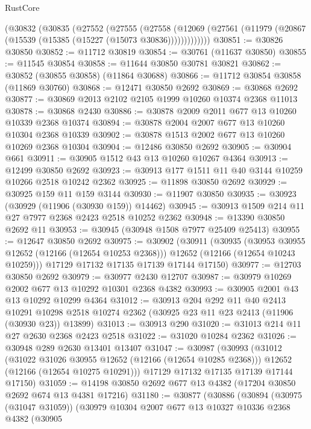 \begin{lexlean}{RustCore}
\begin{coremodule}
    (@30832
      (@30835
        (@27552
          (@27555
            (@27558
              (@12069 (@27561 (@11979 (@20867 (@15539 (@15385 (@15227 (@15073 @30836)))))))))))))
@30851 := @30826 @30850
@30852 := @11712 @30819
@30854 := @30761 (@11637 @30850)
@30855 := @11545 @30854
@30858 := @11644 @30850 @30781 @30821
@30862 := @30852 (@30855 @30858) (@11864 @30688)
@30866 := @11712 @30854 @30858 (@11869 @30760)
@30868 := @12471 @30850 @2692
@30869 := @30868 @2692
@30877 := @30869 @2013 @2102 @2105 @1999 @10260 @10374 @2368 @11013
@30878 := @30868 @2430
@30886 := @30878 @2009 @2011 @677 @13 @10260 @10339 @2368 @10374
@30894 := @30878 @2004 @2007 @677 @13 @10260 @10304 @2368 @10339
@30902 := @30878 @1513 @2002 @677 @13 @10260 @10269 @2368 @10304
@30904 := @12486 @30850 @2692
@30905 := @30904 @661
@30911 := @30905 @1512 @43 @13 @10260 @10267 @4364
@30913 := @12499 @30850 @2692
@30923 := @30913 @177 @1511 @11 @40 @3144 @10259 @10266 @2518 @10242 @2362
@30925 := @11898 @30850 @2692
@30929 := @30925 @159 @11 @159 @3144
@30930 := @11907 @30850
@30935 := @30923 (@30929 (@11906 (@30930 @159)) @14462)
@30945 := @30913 @1509 @214 @11 @27 @7977 @2368 @2423 @2518 @10252 @2362
@30948 := @13390 @30850 @2692 @11
@30953 := @30945 (@30948 @1508 @7977 @25409 @25413)
@30955 := @12647 @30850 @2692
@30975 := @30902
    (@30911
      (@30935
        (@30953 @30955 @12652 (@12166 (@12654 @10253 @2368)))
        @12652
        (@12166 (@12654 @10243 @10259)))
      @17129
      @17132
      @17135
      @17139
      @17144
      @17150)
@30977 := @12703 @30850 @2692
@30979 := @30977 @2430 @12707
@30987 := @30979 @10269 @2002 @677 @13 @10292 @10301 @2368 @4382
@30993 := @30905 @2001 @43 @13 @10292 @10299 @4364
@31012 := @30913
    @204
    @292
    @11
    @40
    @2413
    @10291
    @10298
    @2518
    @10274
    @2362
    (@30925 @23 @11 @23 @2413 (@11906 (@30930 @23)) @13899)
@31013 := @30913 @290
@31020 := @31013 @214 @11 @27 @2630 @2368 @2423 @2518
@31022 := @31020 @10284 @2362
@31026 := @30948 @289 @2630 @13401 @13407
@31047 := @30987
    (@30993
      (@31012
        (@31022 @31026 @30955 @12652 (@12166 (@12654 @10285 @2368)))
        @12652
        (@12166 (@12654 @10275 @10291)))
      @17129
      @17132
      @17135
      @17139
      @17144
      @17150)
@31059 := @14198 @30850 @2692 @677 @13 @4382 (@17204 @30850 @2692 @674 @13 @4381 @17216)
@31180 := @30877
    (@30886
      (@30894
        (@30975 (@31047 @31059))
        (@30979
          @10304
          @2007
          @677
          @13
          @10327
          @10336
          @2368
          @4382
          (@30905

\end{coremodule}
\end{lexlean}
